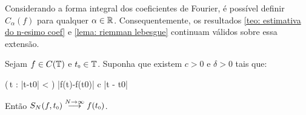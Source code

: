 \documentclass[../main.tex]{subfiles}
\begin{document}
\begin{corolario}
    Considerando a forma integral dos coeficientes de Fourier, é possível definir $C_\alpha(f)$ para qualquer $\alpha \in \operatorname{\mathbb{R}}$. Consequentemente, os resultados \ref{teo: estimativa do n-esimo coef} e \ref{lema: riemman lebesgue} continuam válidos sobre essa extensão.
 \end{corolario}

\begin{teorema}
    Sejam $f\in C(\mathbb T)$ e $\sub t0\in \UnitalCircle$. Suponha que existem $c > 0$ e $\delta> 0$ tais que:
    \begin{eqspaced*}{(\forall\,t : |t-\sub t0| < \delta)}
        |f(t)-f(\sub t0)| \leqslant c |t - \sub t0|
    \end{eqspaced*}
    Então $S_N(f, \sub t0) \overset{N \to \infty}{\longto} f(\sub t0)$.


\end{teorema}
\end{document}
